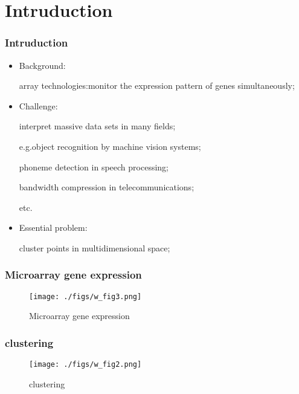 \section{Intruduction}
\begin{frame}
\sectionpage
\end{frame}

\begin{frame}
    \frametitle{Intruduction}
    \begin{itemize}
        \item Background:
        
        array technologies:monitor the expression pattern of genes simultaneously;

        \item Challenge:
        
        interpret massive data sets in many fields;
        
        e.g.object recognition by machine vision systems;

        \hspace{1.2em} phoneme detection in speech processing;

        \hspace{1.3em} bandwidth compression in telecommunications;

        \hspace{1.3em} etc.

        \item Essential problem:
        
        cluster points in multidimensional space;
    \end{itemize}
\end{frame}



\begin{frame}
    \frametitle{Microarray gene expression}
    \begin{figure}[h]
        \centering
        \texttt{[image: ./figs/w\_fig3.png]}
        \label{Microarray gene expression}
        \caption{Microarray gene expression}
    \end{figure}
\end{frame}

\begin{frame}
    \frametitle{clustering}
    \begin{figure}[h]
        \centering
        \texttt{[image: ./figs/w\_fig2.png]}
        \label{clustering}
        \caption{clustering}
    \end{figure}
\end{frame}



